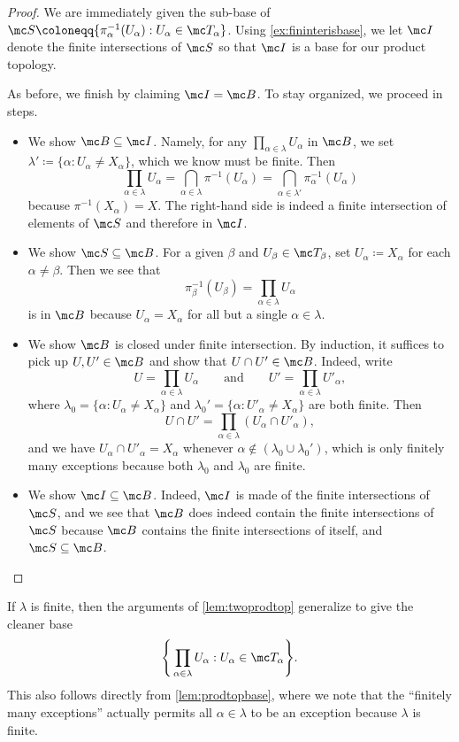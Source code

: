 \documentclass[../notes.tex]{subfiles}
\begin{document}
\begin{proof}
	We are immediately given the sub-base of $\mc S\coloneqq\{\pi_\alpha^{-1}(U_\alpha):U_\alpha\in\mc T_\alpha\}$. Using \autoref{ex:fininterisbase}, we let $\mc I$ denote the finite intersections of $\mc S$ so that $\mc I$ is a base for our product topology.
	
	As before, we finish by claiming $\mc I=\mc B$. To stay organized, we proceed in steps.
	\begin{itemize}
		\item We show $\mc B\subseteq\mc I$. Namely, for any $\prod_{\alpha\in\lambda}U_\alpha$ in $\mc B$, we set $\lambda'\coloneqq\{\alpha:U_\alpha\ne X_\alpha\}$, which we know must be finite. Then
		\[\prod_{\alpha\in\lambda}U_\alpha=\bigcap_{\alpha\in\lambda}\pi^{-1}(U_\alpha)=\bigcap_{\alpha\in\lambda'}\pi_\alpha^{-1}(U_\alpha)\]
		because $\pi^{-1}(X_\alpha)=X$. The right-hand side is indeed a finite intersection of elements of $\mc S$ and therefore in $\mc I$.
		\item We show $\mc S\subseteq\mc B$. For a given $\beta$ and $U_\beta\in\mc T_\beta$, set $U_\alpha\coloneqq X_\alpha$ for each $\alpha\ne\beta$. Then we see that
		\[\pi_\beta^{-1}(U_\beta)=\prod_{\alpha\in\lambda}U_\alpha\]
		is in $\mc B$ because $U_\alpha=X_\alpha$ for all but a single $\alpha\in\lambda$.
		\item We show $\mc B$ is closed under finite intersection. By induction, it suffices to pick up $U,U'\in\mc B$ and show that $U\cap U'\in\mc B$. Indeed, write
		\[U=\prod_{\alpha\in\lambda}U_\alpha\qquad\text{and}\qquad U'=\prod_{\alpha\in\lambda}U'_\alpha,\]
		where $\lambda_0=\{\alpha:U_\alpha\ne X_\alpha\}$ and $\lambda_0'=\{\alpha:U'_\alpha\ne X_\alpha\}$ are both finite. Then
		\[U\cap U'=\prod_{\alpha\in\lambda}(U_\alpha\cap U'_\alpha),\]
		and we have $U_\alpha\cap U'_\alpha=X_\alpha$ whenever $\alpha\notin(\lambda_0\cup\lambda_0')$, which is only finitely many exceptions because both $\lambda_0$ and $\lambda_0$ are finite.
		\item We show $\mc I\subseteq\mc B$. Indeed, $\mc I$ is made of the finite intersections of $\mc S$, and we see that $\mc B$ does indeed contain the finite intersections of $\mc S$ because $\mc B$ contains the finite intersections of itself, and $\mc S\subseteq\mc B$.
		\qedhere
	\end{itemize}
\end{proof}
\begin{remark}
	If $\lambda$ is finite, then the arguments of \autoref{lem:twoprodtop} generalize to give the cleaner base
	\[\Bigg\{\prod_{\alpha\in\lambda}U_\alpha:U_\alpha\in\mc T_\alpha\Bigg\}.\]
	This also follows directly from \autoref{lem:prodtopbase}, where we note that the ``finitely many exceptions'' actually permits all $\alpha\in\lambda$ to be an exception because $\lambda$ is finite.
\end{remark}
\end{document}
